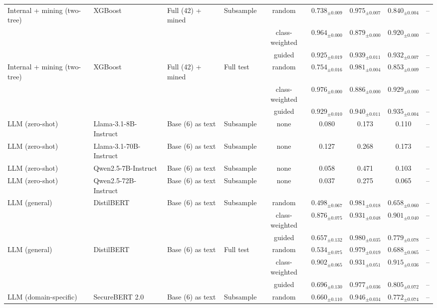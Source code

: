 \begin{longtable}{llllcccc}
\addlinespace
Internal + mining (two-tree) & XGBoost & Full (42) + mined & Subsample & random & $0.738_{\pm 0.009}$ & $0.975_{\pm 0.007}$ & $0.840_{\pm 0.004}$ & -- \\
 &  &  &  & class-weighted & $0.964_{\pm 0.000}$ & $0.879_{\pm 0.000}$ & $0.920_{\pm 0.000}$ & -- \\
 &  &  &  & guided & $0.925_{\pm 0.019}$ & $0.939_{\pm 0.011}$ & $0.932_{\pm 0.007}$ & -- \\
\addlinespace
Internal + mining (two-tree) & XGBoost & Full (42) + mined & Full test & random & $0.754_{\pm 0.016}$ & $0.981_{\pm 0.004}$ & $0.853_{\pm 0.009}$ & -- \\
 &  &  &  & class-weighted & $0.976_{\pm 0.000}$ & $0.886_{\pm 0.000}$ & $0.929_{\pm 0.000}$ & -- \\
 &  &  &  & guided & $0.929_{\pm 0.010}$ & $0.940_{\pm 0.011}$ & $0.935_{\pm 0.004}$ & -- \\
\midrule
LLM (zero-shot) & Llama-3.1-8B-Instruct & Base (6) as text & Subsample & none & 0.080 & 0.173 & 0.110 & -- \\
\addlinespace
LLM (zero-shot) & Llama-3.1-70B-Instruct & Base (6) as text & Subsample & none & 0.127 & 0.268 & 0.173 & -- \\
\addlinespace
LLM (zero-shot) & Qwen2.5-7B-Instruct & Base (6) as text & Subsample & none & 0.058 & 0.471 & 0.103 & -- \\
\addlinespace
LLM (zero-shot) & Qwen2.5-72B-Instruct & Base (6) as text & Subsample & none & 0.037 & 0.275 & 0.065 & -- \\
\addlinespace
LLM (general) & DistilBERT & Base (6) as text & Subsample & random & $0.498_{\pm 0.067}$ & $0.981_{\pm 0.018}$ & $0.658_{\pm 0.060}$ & -- \\
 &  &  &  & class-weighted & $0.876_{\pm 0.075}$ & $0.931_{\pm 0.048}$ & $0.901_{\pm 0.040}$ & -- \\
 &  &  &  & guided & $0.657_{\pm 0.132}$ & $0.980_{\pm 0.035}$ & $0.779_{\pm 0.078}$ & -- \\
\addlinespace
LLM (general) & DistilBERT & Base (6) as text & Full test & random & $0.534_{\pm 0.075}$ & $0.979_{\pm 0.019}$ & $0.688_{\pm 0.065}$ & -- \\
 &  &  &  & class-weighted & $0.902_{\pm 0.065}$ & $0.931_{\pm 0.051}$ & $0.915_{\pm 0.036}$ & -- \\
 &  &  &  & guided & $0.696_{\pm 0.130}$ & $0.977_{\pm 0.036}$ & $0.805_{\pm 0.072}$ & -- \\
\addlinespace
LLM (domain-specific) & SecureBERT 2.0 & Base (6) as text & Subsample & random & $0.660_{\pm 0.110}$ & $0.946_{\pm 0.034}$ & $0.772_{\pm 0.074}$ & -- \\

\end{longtable}
